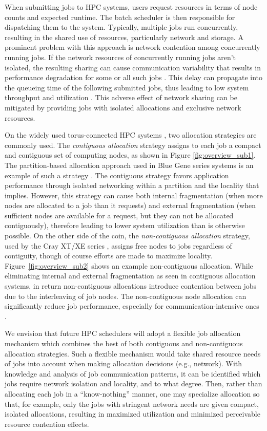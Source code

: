 \documentclass[conference]{IEEEtran}
\begin{document}
When submitting jobs to HPC systems, users request resources in terms of node counts and expected runtime. The batch scheduler is then responsible for dispatching them to the system. Typically, multiple jobs run concurrently, resulting in the shared use of resources, particularly network and storage. A prominent problem with this approach is network contention among concurrently running jobs. If the network resources of concurrently running jobs aren't isolated, the resulting sharing can cause communication variability that results in performance degradation for some or all such jobs \cite{abhinav-sc13}. This delay can propagate into the queueing time of the following submitted jobs, thus leading to low system throughput and utilization \cite{jose-ipdps15}. This adverse effect of network sharing can be mitigated by providing jobs with isolated allocations and exclusive network resources.

On the widely used torus-connected HPC systems \cite{bgq,tofu,titan}, two allocation strategies are commonly used. The \emph{contiguous allocation} strategy assigns to each job a compact and contiguous set of computing nodes, as shown in Figure \ref{fig:overview_sub1}. The partition-based allocation approach used in Blue Gene series systems is an example of such a strategy \cite{bgloverview}. The contiguous strategy favors application performance through isolated networking within a partition and the locality that implies. However, this strategy can cause both internal fragmentation (when more nodes are allocated to a job than it requests) and external fragmentation (when sufficient nodes are available for a request, but they can not be allocated contiguously), therefore leading to lower system utilization than is otherwise possible. On the other side of the coin, the \emph{non-contiguous allocation} strategy, used by the Cray XT/XE series \cite{carl-cug}, assigns free nodes to jobs regardless of contiguity, though of course efforts are made to maximize locality. Figure~\ref{fig:overview_sub2} shows an example non-contiguous allocation. While eliminating internal and external fragmentation as seen in contiguous allocation systems, in return non-contiguous allocations introduce contention between jobs due to the interleaving of job nodes. The non-contiguous node allocation can significantly reduce job performance, especially for communication-intensive ones \cite{abhinav-sc13}.

We envision that future HPC schedulers will adopt a flexible job allocation mechanism which combines the best of both contiguous and non-contiguous allocation strategies. Such a flexible mechanism would take shared resource needs of jobs into account when making allocation decisions (e.g., network). With knowledge and analysis of job communication patterns, it can be identified which jobs require network isolation and locality, and to what degree. Then, rather than allocating each job in a ``know-nothing'' manner, one may specialize allocation so that, for example, only the jobs with stringent network needs are given compact, isolated allocations, resulting in maximized utilization and minimized perceivable resource contention effects.
\end{document}
